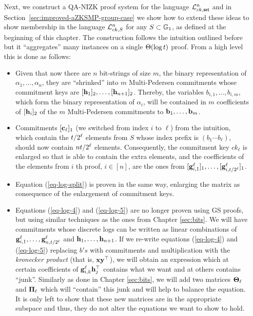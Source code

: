 Next, we construct a QA-NIZK proof system for the language
\(
\mathcal{L}_{ck,\mathsf{set}}^n
\)
and in Section~\ref{sec:improved-aZKSMP-group-case} we show how to extend these ideas to show membership in the language
\(
\mathcal{L}_{ck,S}^n\)
for any \(S\subset\mathbb{G}_1\), as defined at the beginning of this chapter.
The construction follows the intuition outlined before but it ``aggregates'' many instances on a single \(\Theta(\log t )\) proof. From a high level this is done as follows:
\begin{itemize}
\item Given that now there are \(n\) bit-strings of size \(m\), the binary representation of $\alpha_1,\ldots,\alpha_n$, they are ``shrinked'' into \(m\) Multi-Pedersen commitments whose commitment keys are \([\mathbf{h}_1]_2,\ldots,[\mathbf{h}_{n+1}]_2\). Thereby, the variables $b_{i,1},\ldots,b_{i,m}$, which form the binary representation of $\alpha_i$, will be contained in \(m\) coefficients of \([\mathbf{h}_i]_2\) of the $m$ Multi-Pedersen commitments to $\mathbf{b}_1,\ldots,\mathbf{b}_m$.
\item Commitments \([\mathbf{c}_\ell]_1\) (we switched from index \(i\) to \(\ell\)) from the intuition, which contain the \(t /2^\ell\) elements from \(S\) whose index prefix is \((b_1\cdots b_{\ell})\), should now contain \(nt /2^\ell\) elements. Consequently, the commitment key \(ck_\ell\) is enlarged so that is able to contain the extra elements, and the coefficients of the elements from \(i\) th proof, \( i\in [n]\), are the ones from \([\mathbf{g}_{i,1}^\ell]_1,\ldots,[\mathbf{g}_{i,t /2^\ell}^\ell]_1\).
\item Equation (\ref{eq-log-split}) is proven in the same way, enlarging the matrix as consequence of the enlargement of commitment keys.
\item Equations (\ref{eq-log-4}) and (\ref{eq-log-5}) are no longer proven using GS proofs, but using similar techniques as the ones from Chapter \ref{sec:bits}. We will have commitments whose discrete logs can be written as linear combinations of \(\mathbf{g}_{i,1}^\ell,\ldots,\mathbf{g}_{n,t /2^\ell}^\ell\) and \(\mathbf{h}_1,\ldots,\mathbf{h}_{n+1}\). If we re-write equations (\ref{eq-log-4}) and (\ref{eq-log-5}) replacing \(b's\) with commitments and multiplication with the \emph{kronecker product} (that is, \(\mathbf{x}\mathbf{y}^\top\)), we will obtain an expression which at certain coefficients of \(\mathbf{g}_{i,k}^\ell\mathbf{h}_j^\top\) contains what we want and at others contains ``junk''. Similarly as done in Chapter \ref{sec:bits}, we will add two matrices \(\mathbf{{\Theta}}_\ell\) and \(\mathbf{{\Pi}}_\ell\) which will ``contain'' this junk and will help to balance the equation. It is only left to show that these new matrices are in the appropriate subspace and thus, they do not alter the equations we want to show to hold.

\end{itemize}
